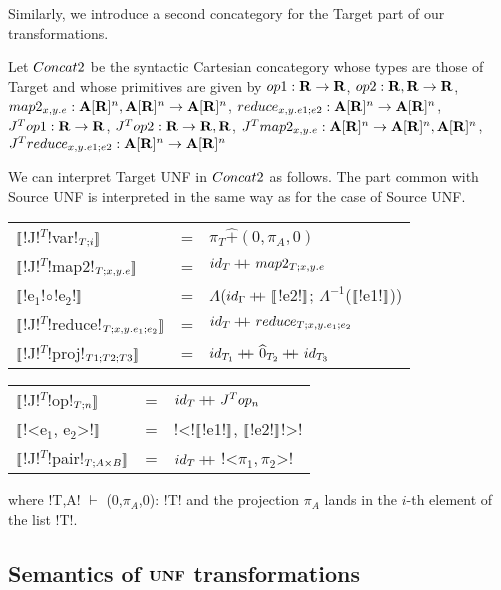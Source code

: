 Similarly, we introduce a second concategory for the Target part of our transformations.

\begin{definition}[$\ConcatT$]
Let $\ConcatT$ be the syntactic Cartesian concategory whose types are those of Target and 
whose primitives are given by 
$op1: \mathbf{R} \to \mathbf{R}$, 
$op2: \mathbf{R},\mathbf{R} \to \mathbf{R}$, 
$map2_{x,y.e}: \mathbf{A}[\mathbf{R}]^{n},\mathbf{A}[\mathbf{R}]^{n}\to \mathbf{A}[\mathbf{R}]^{n}$, 
$reduce_{x,y.e1;e2}: \mathbf{A}[\mathbf{R}]^{n} \to \mathbf{A}[\mathbf{R}]^{n}$, 
$J^Top1: \mathbf{R} \to \mathbf{R}$, 
$J^Top2: \mathbf{R} \to \mathbf{R}, \mathbf{R}$, 
$J^Tmap2_{x,y.e}: \mathbf{A}[\mathbf{R}]^{n} \to \mathbf{A}[\mathbf{R}]^{n}, \mathbf{A}[\mathbf{R}]^{n}$, 
$J^Treduce_{x,y.e1;e2}: \mathbf{A}[\mathbf{R}]^{n} \to \mathbf{A}[\mathbf{R}]^{n}$ 
\end{definition}

We can interpret Target UNF in $\ConcatT$ as follows. 
The part common with Source UNF is interpreted in the same way as for the case of Source UNF.

\begin{tabular}{l c l}
    $\llbracket$!J!$^T$!var!$_{T;i} \rrbracket$ &=& $\pi_T \widehat{+}(0,\pi_A,0)$ \\
    $\llbracket$!J!$^T$!map2!$_{T;x,y.e}\rrbracket$  &=& $id_T+\kern-1.3ex+\kern0.8ex map2_{T;x,y.e}$ \\
    $\llbracket$!e$_1$!$\circ$!e$_2$!$\rrbracket$ &=& $\Lambda$($id_\Gamma+\kern-1.3ex+\kern0.8ex\llbracket$!e2!$\rrbracket$; $\Lambda^{-1}$($\llbracket$!e1!$\rrbracket$)) \\
    $\llbracket$!J!$^T$!reduce!$_{T;x,y.e_1;e_2}\rrbracket$  &=& $id_T+\kern-1.3ex+\kern0.8ex reduce_{T;x,y.e_1;e_2}$ \\
    $\llbracket$!J!$^T$!proj!$_{T1;T2;T3} \rrbracket$ &=& $id_{T_1}+\kern-1.3ex+\kern0.8ex\widehat{0}_{T_2}+\kern-1.3ex+\kern0.8ex id_{T_3}$ 
    \end{tabular}
    \begin{tabular}{l c l}
    $\llbracket$!J!$^T$!op!$_{T;n} \rrbracket$ &=& $id_T+\kern-1.3ex+\kern0.8ex J^Top_n$ \\
    $\llbracket$!<e$_1$, e$_2$>!$\rrbracket$  &=& !<!$\llbracket$!e1!$\rrbracket$, $\llbracket$!e2!$\rrbracket$!>! \\
    $\llbracket$!J!$^T$!pair!$_{T;A\times B} \rrbracket$ &=& $id_T+\kern-1.3ex+\kern0.8ex$!<$\pi_1,\pi_2$>! \\
 \end{tabular}
 where !T,A! $\vdash$ (0,$\pi_A$,0): !T! and the projection $\pi_A$ lands in the $i$-th element of the list !T!.

\subsection{Semantics of $\mathbf{UNF}$ transformations} %
\label{sub:Semantics for UNF transformations}

